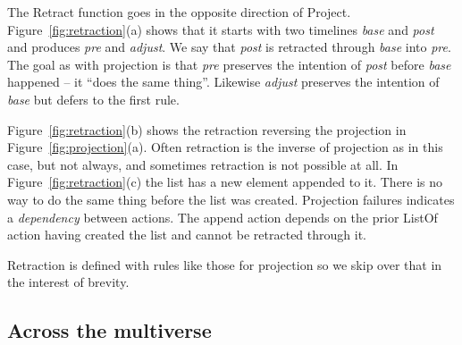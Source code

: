 \documentclass[english,submission]{programming}
\theoremstyle{definition}
\begin{document}
The \textsf{Retract} function goes in the opposite direction of \textsf{Project}. Figure~\ref{fig:retraction}(a) shows that it starts with two timelines \textit{base} and \textit{post} and produces \textit{pre} and \textit{adjust}. We say that \textit{post} is retracted through \textit{base} into \textit{pre}. The goal as with projection is that \textit{pre} preserves the intention of \textit{post} before \textit{base} happened -- it ``does the same thing''. Likewise \textit{adjust} preserves the intention of \textit{base} but defers to the first rule.

Figure~\ref{fig:retraction}(b) shows the retraction reversing the projection in Figure~\ref{fig:projection}(a). Often retraction is the inverse of projection as in this case, but not always, and sometimes retraction is not possible at all. In Figure~\ref{fig:retraction}(c) the list has a new element appended to it. There is no way to do the same thing before the list was created. Projection failures indicates a \textit{dependency} between actions. The \textsf{append} action depends on the prior \textsf{ListOf} action having created the list and cannot be retracted through it.

Retraction is defined with rules like those for projection so we skip over that in the interest of brevity.


\subsection{Across the multiverse}
\end{document}
